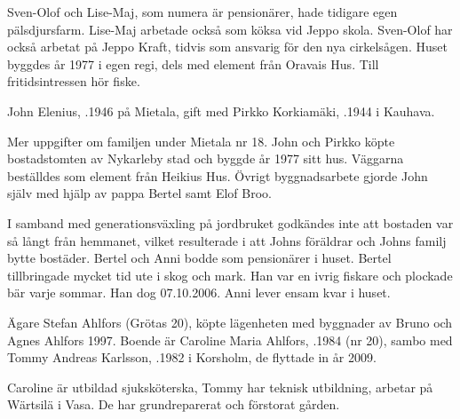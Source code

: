 Sven-Olof och Lise-Maj, som numera är pensionärer, hade tidigare egen pälsdjursfarm. Lise-Maj arbetade också som köksa vid Jeppo skola. Sven-Olof har också arbetat på Jeppo Kraft, tidvis som ansvarig för den nya cirkelsågen. Huset byggdes år 1977 i egen regi, dels med element från Oravais Hus. Till fritidsintressen hör fiske.






John Elenius, .1946 på Mietala, gift med Pirkko Korkiamäki, .1944 i Kauhava.
\begin{jhchildren}
  \item {}
  \item {}
\end{jhchildren}

Mer uppgifter om familjen under Mietala nr 18. John och Pirkko köpte bostadstomten av Nykarleby stad och byggde år 1977 sitt hus. Väggarna beställdes som element från Heikius Hus. Övrigt byggnadsarbete gjorde John själv med hjälp av pappa Bertel samt Elof Broo.

I samband med generationsväxling på jordbruket godkändes inte att bostaden var så långt från hemmanet, vilket resulterade i att Johns föräldrar och Johns familj bytte bostäder. Bertel och Anni bodde som pensionärer i huset. Bertel tillbringade mycket tid ute i skog och mark. Han var en ivrig fiskare och plockade bär varje sommar. Han dog 07.10.2006. Anni lever ensam kvar i huset.






Ägare Stefan Ahlfors (Grötas 20), köpte lägenheten med byggnader av Bruno och Agnes Ahlfors 1997. Boende är Caroline  Maria Ahlfors, .1984 (nr 20), sambo med Tommy Andreas Karlsson, .1982 i Korsholm, de flyttade in år 2009.

Caroline är utbildad sjuksköterska, Tommy har teknisk utbildning, arbetar på Wärtsilä i Vasa. De har grundreparerat och förstorat gården.
\begin{jhchildren}
  \item {}
  \item {}
\end{jhchildren}


